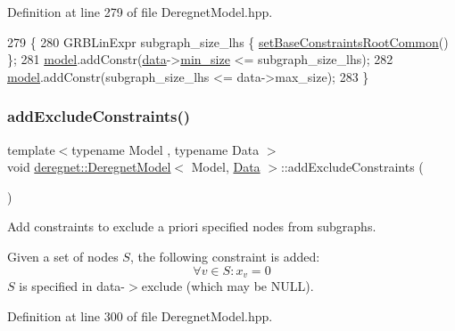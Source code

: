 Definition at line 279 of file Deregnet\+Model.\+hpp.


\begin{DoxyCode}
279                                                                       \{
280     GRBLinExpr subgraph\_size\_lhs \{ \hyperlink{classderegnet_1_1DeregnetModel_ab6093e7558a653c17145e8e08a96938f}{setBaseConstraintsRootCommon}() \};
281     \hyperlink{classderegnet_1_1DeregnetModel_a30d525de2086e342b33fe3e45ede4947}{model}.addConstr(\hyperlink{classderegnet_1_1DeregnetModel_ad5399761cf6293a702f3800bda4806d1}{data}->\hyperlink{classderegnet_1_1AvgdrgntData_a733e0cd627433fca043a7f9b70af18c3}{min\_size} <= subgraph\_size\_lhs);
282     \hyperlink{classderegnet_1_1DeregnetModel_a30d525de2086e342b33fe3e45ede4947}{model}.addConstr(subgraph\_size\_lhs <= data->max\_size);
283 \}
\end{DoxyCode}
\mbox{\label{classderegnet_1_1DeregnetModel_a3b47185dcea73dbcad67d115c55ae762}} 
\subsubsection{\texorpdfstring{add\+Exclude\+Constraints()}{addExcludeConstraints()}}
{\footnotesize\ttfamily template$<$typename Model , typename Data $>$ \\
void \hyperlink{classderegnet_1_1DeregnetModel}{deregnet\+::\+Deregnet\+Model}$<$ Model, \hyperlink{avgdrgnt_8cpp_a1d1235306db276e9b36acba1db1509e8}{Data} $>$\+::add\+Exclude\+Constraints (\begin{DoxyParamCaption}{ }\end{DoxyParamCaption})}



Add constraints to exclude a priori specified nodes from subgraphs. 

Given a set of nodes $S$, the following constraint is added\+: \[ \begin{equation} \forall v \in S: x_v = 0 \end{equation} \] $S$ is specified in data-\/$>$exclude (which may be N\+U\+LL). 

Definition at line 300 of file Deregnet\+Model.\+hpp.


